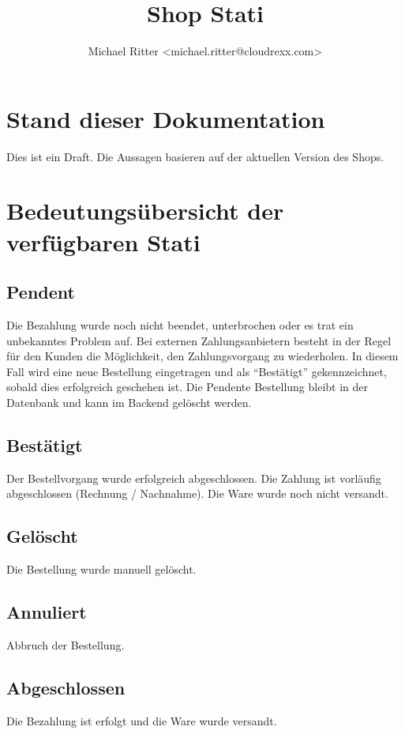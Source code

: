 \documentclass[a4paper]{scrreprt}
\title{Shop Stati}
\author{Michael Ritter <michael.ritter@cloudrexx.com>}
\begin{document}
    \maketitle
    \tableofcontents
    \cleardoublepage
    \chapter{Stand dieser Dokumentation}
        Dies ist ein Draft. Die Aussagen basieren auf der aktuellen Version des
        Shops.
    \chapter{Bedeutungsübersicht der verfügbaren Stati}
        \section{Pendent}
        Die Bezahlung wurde noch nicht beendet, unterbrochen oder es trat ein
        unbekanntes Problem auf. Bei externen Zahlungsanbietern besteht in der
        Regel für den Kunden die Möglichkeit, den Zahlungsvorgang zu wiederholen.
        In diesem Fall wird eine neue Bestellung eingetragen und als ``Bestätigt''
        gekennzeichnet, sobald dies erfolgreich geschehen ist. Die Pendente
        Bestellung bleibt in der Datenbank und kann im Backend gelöscht werden.

        \section{Bestätigt}
        Der Bestellvorgang wurde erfolgreich abgeschlossen. Die Zahlung ist
        vorläufig abgeschlossen (Rechnung / Nachnahme). Die Ware wurde noch
        nicht versandt.

        \section{Gelöscht}
        Die Bestellung wurde manuell gelöscht.

        \section{Annuliert}
        Abbruch der Bestellung.

        \section{Abgeschlossen}
        Die Bezahlung ist erfolgt und die Ware wurde versandt.
\end{document}
